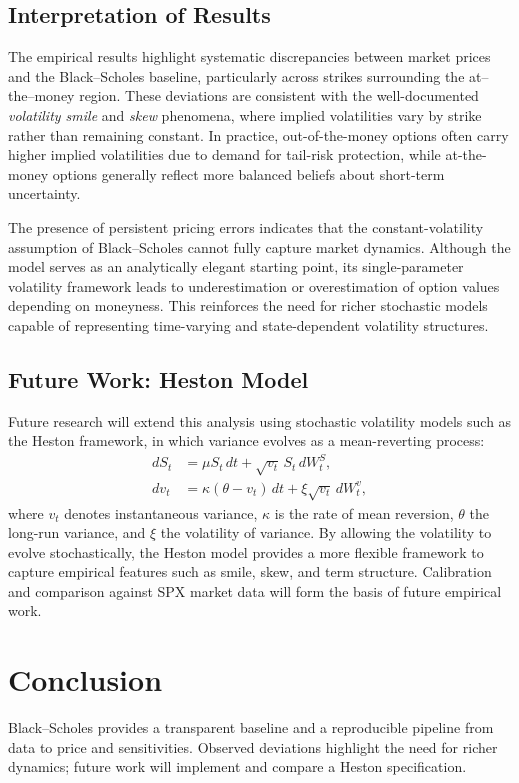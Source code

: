 \documentclass[12pt]{article}
\begin{document}
\subsection{Interpretation of Results}
The empirical results highlight systematic discrepancies between market prices and the Black--Scholes baseline, particularly across strikes surrounding the at--the--money region. These deviations are consistent with the well-documented \emph{volatility smile} and \emph{skew} phenomena, where implied volatilities vary by strike rather than remaining constant. In practice, out-of-the-money options often carry higher implied volatilities due to demand for tail-risk protection, while at-the-money options generally reflect more balanced beliefs about short-term uncertainty.

The presence of persistent pricing errors indicates that the constant-volatility assumption of Black--Scholes cannot fully capture market dynamics. Although the model serves as an analytically elegant starting point, its single-parameter volatility framework leads to underestimation or overestimation of option values depending on moneyness. This reinforces the need for richer stochastic models capable of representing time-varying and state-dependent volatility structures.

\subsection{Future Work: Heston Model}
Future research will extend this analysis using stochastic volatility models such as the Heston framework, in which variance evolves as a mean-reverting process:
\begin{equation}
\begin{aligned}
dS_t &= \mu S_t\,dt + \sqrt{v_t}\, S_t\, dW_t^S, \\
dv_t &= \kappa(\theta - v_t)\,dt + \xi \sqrt{v_t}\, dW_t^v,
\end{aligned}
\end{equation}
where $v_t$ denotes instantaneous variance, $\kappa$ is the rate of mean reversion, $\theta$ the long-run variance, and $\xi$ the volatility of variance. By allowing the volatility to evolve stochastically, the Heston model provides a more flexible framework to capture empirical features such as smile, skew, and term structure. Calibration and comparison against SPX market data will form the basis of future empirical work.


\section{Conclusion}
Black--Scholes provides a transparent baseline and a reproducible pipeline from data to price and sensitivities.
Observed deviations highlight the need for richer dynamics; future work will implement and compare a Heston specification.
\end{document}
